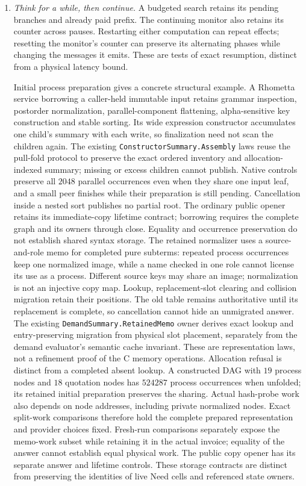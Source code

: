 \documentclass[11pt]{article}
\theoremstyle{definition}
\theoremstyle{remark}
\begin{document}
\begin{enumerate}
\item \emph{Think for a while, then continue.}
A budgeted search retains its pending branches and already paid prefix.
The continuing monitor also retains its counter across pauses. Restarting
either computation can repeat effects; resetting the monitor's counter
can preserve its alternating phases while changing the messages it emits.
These are tests of exact resumption, distinct from a physical latency bound.

Initial process preparation gives a concrete structural example. A Rhometta
service borrowing a caller-held immutable input retains grammar inspection,
postorder normalization, parallel-component flattening, alpha-sensitive key
construction and stable sorting. Its wide expression constructor accumulates
one child's summary with each write, so finalization need not scan the
children again. The existing \nolinkurl{ConstructorSummary.Assembly} laws
reuse the pull-fold protocol to preserve the exact ordered inventory and
allocation-indexed summary; missing or excess children cannot publish.
Native controls preserve all $2048$ parallel occurrences even when they
share one input leaf, and a small peer finishes while their preparation is
still pending. Cancellation inside a nested sort publishes no partial root.
The ordinary public opener retains its immediate-copy lifetime contract;
borrowing requires the complete graph and its owners through close.
Equality and occurrence preservation do not establish shared syntax storage.
The retained normalizer uses a source-and-role memo for completed pure
subterms: repeated process occurrences keep one normalized image, while a
name checked in one role cannot license its use as a process. Different
source keys may share an image; normalization is not an injective copy map.
Lookup, replacement-slot clearing and collision migration retain their
positions. The old table remains authoritative until its replacement is
complete, so cancellation cannot hide an unmigrated answer. The existing
\nolinkurl{DemandSummary.RetainedMemo} owner derives exact lookup and
entry-preserving migration from physical slot placement, separately from
the demand evaluator's semantic cache invariant. These are representation
laws, not a refinement proof of the C memory operations. Allocation
refusal is distinct from a completed absent lookup. A constructed DAG with
$19$ process nodes and $18$ quotation nodes has $524287$ process occurrences
when unfolded; its retained initial preparation preserves the sharing.
Actual hash-probe work also depends on node addresses, including private
normalized nodes. Exact split-work comparisons therefore hold the complete
prepared representation and provider choices fixed. Fresh-run comparisons
separately expose the memo-work subset while retaining it in the actual
invoice; equality of the answer cannot establish equal physical work.
The public copy opener has its separate answer and lifetime controls.
These storage contracts are distinct from preserving the identities of
live Need cells and referenced state owners.


\end{enumerate}
\end{document}
